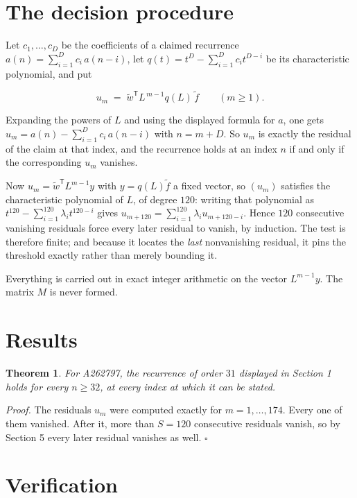 \documentclass[11pt]{article}
\newtheorem{theorem}{Theorem}
\theoremstyle{definition}
\begin{document}
\section{The decision procedure}

Let $c_1,\dots,c_D$ be the coefficients of a claimed recurrence $a(n) = \sum_{i=1}^{D} c_i\,a(n-i)$, let $q(t) = t^{D} - \sum_{i=1}^{D} c_i t^{D-i}$ be its characteristic polynomial, and put

\[u_m \;=\; \tilde w^{\mathsf T} L^{\,m-1} q(L)\,\tilde f \qquad (m \ge 1).\]

Expanding the powers of $L$ and using the displayed formula for $a$, one gets $u_m = a(n) - \sum_{i=1}^{D} c_i\,a(n-i)$ with $n = m + D$. So $u_m$ is exactly the residual of the claim at that index, and the recurrence holds at an index $n$ if and only if the corresponding $u_m$ vanishes.

Now $u_m = \tilde w^{\mathsf T} L^{m-1} y$ with $y = q(L)\tilde f$ a fixed vector, so $(u_m)$ satisfies the characteristic polynomial of $L$, of degree $120$: writing that polynomial as $t^{120} - \sum_{i=1}^{120} \lambda_i t^{120-i}$ gives $u_{m+120} = \sum_{i=1}^{120} \lambda_i u_{m+120-i}$. Hence $120$ consecutive vanishing residuals force every later residual to vanish, by induction. The test is therefore finite; and because it locates the {\itshape last} nonvanishing residual, it pins the threshold exactly rather than merely bounding it.

Everything is carried out in exact integer arithmetic on the vector $L^{m-1}y$. The matrix $M$ is never formed.

\section{Results}

\begin{theorem} For A262797, the recurrence of order $31$ displayed in Section 1 holds for every $n \ge 32$, at every index at which it can be stated.\end{theorem}

{\itshape Proof.} The residuals $u_m$ were computed exactly for $m = 1,\dots,174$. Every one of them vanished. After it, more than $S = 120$ consecutive residuals vanish, so by Section 5 every later residual vanishes as well. $\square$

\section{Verification}
\end{document}
